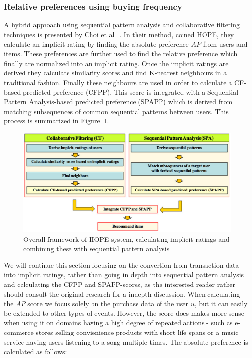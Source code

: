 \subsubsection{Relative preferences using buying frequency}

A hybrid approach using sequential pattern analysis and collaborative filtering
techniques is presented by Choi et al.~\cite{choi2012hybrid}. In their
method, coined HOPE, they calculate an implicit rating by finding the
absolute preference $AP$ from users and items. These preferences are further
used to find the relative preference which finally are normalized into an
implicit rating. Once the implicit ratings are derived they calculate
similarity scores and find K-nearest neighbours in a traditional fashion.
Finally these neighbours are used in order to calculate a CF-based predicted
preference (CFPP). This score is integrated with a Sequential Pattern
Analysis-based predicted preference (SPAPP) which is derived from matching
subsequences of common sequential patterns between users. This process is
summarized in Figure~\ref{hope-system}.

\begin{figure}[H]
  \centering
  \includegraphics[scale=0.3]{image/hope-system}
  \caption{Overall framework of HOPE system, calculating implicit ratings and
  combining these with sequential pattern analysis}
  \label{hope-system}
\end{figure}

We will continue this section focusing on the convertion from transaction data
into implicit ratings, rather than going in depth into sequential pattern
analysis and calculating the CFPP and SPAPP-scores, as the interested reader
rather should consult the original research for a indepth discussion. When
calculating the $AP$ score we focus solely on the purchase data of the user
$u$, but it can easily be extended to other types of events. However, the score
does makes more sense when using it on domains having a high degree of repeated
actions - such as e-commerce stores selling convienience products with short
life spans or a music service having users listening to a song multiple times.
The absolute preference is calculated as follows:

